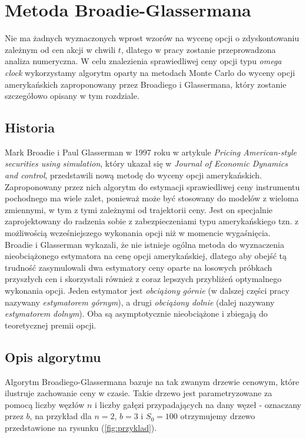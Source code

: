 \documentclass[]{pwr_wmat_praca_dyplomowa}
\theoremstyle{plain}
\numberwithin{theorem}{chapter}
\theoremstyle{definition}
\numberwithin{theorem}{chapter}
\begin{document}
\chapter{Metoda Broadie-Glassermana}

Nie ma żadnych wyznaczonych wprost wzorów na wycenę opcji o zdyskontowaniu zależnym od cen akcji w chwili $t$, dlatego w pracy zostanie przeprowadzona analiza numeryczna.
\newline
\newline
W celu znalezienia sprawiedliwej ceny opcji typu \textit{omega clock} wykorzystamy algorytm oparty na metodach Monte Carlo do wyceny opcji amerykańskich zaproponowany przez Broadiego i Glassermana, który zostanie szczegółowo opisany w tym rozdziale.

\section{Historia}
Mark Broadie i Paul Glasserman w 1997 roku w artykule \textit{Pricing American-style securities using simulation}, który ukazał się w \textit{Journal of Economic Dynamics and control}, przedstawili nową metodę do wyceny opcji amerykańskich. Zaproponowany przez nich algorytm do estymacji sprawiedliwej ceny instrumentu pochodnego ma wiele zalet, ponieważ może być stosowany do modelów z wieloma zmiennymi, w tym z tymi zależnymi od trajektorii ceny. Jest on specjalnie zaprojektowany do radzenia sobie z zabezpieczeniami typu amerykańskiego tzn. z możliwością wcześniejszego wykonania opcji niż w momencie wygaśnięcia.\\

\noindent Broadie i Glasserman wykazali, że nie istnieje ogólna metoda do wyznaczenia nieobciążonego estymatora na cenę opcji amerykańskiej, dlatego aby obejść tą trudność zasymulowali dwa estymatory ceny oparte na losowych próbkach przyszłych cen i skorzystali również z coraz lepszych przybliżeń optymalnego wykonania opcji. Jeden estymator jest \textit{obciążony górnie} (w dalszej części pracy nazywany \textit{estymatorem górnym}), a drugi \textit{obciążony dolnie} (dalej nazywany \textit{estymatorem dolnym}). Oba są asymptotycznie nieobciążone i zbiegają do teoretycznej premii opcji.

\section{Opis algorytmu}

Algorytm Broadiego-Glassermana bazuje na tak zwanym drzewie cenowym, które ilustruje zachowanie ceny w czasie. Takie drzewo jest parametryzowane za pomocą liczby węzłów $n$ i liczby gałęzi przypadających na dany węzeł - oznaczany przez $b$, na przykład dla $n=2$, $b=3$ i $S_0 = 100$ otrzymujemy drzewo przedstawione na rysunku (\ref{fig:przyklad}).
\end{document}
